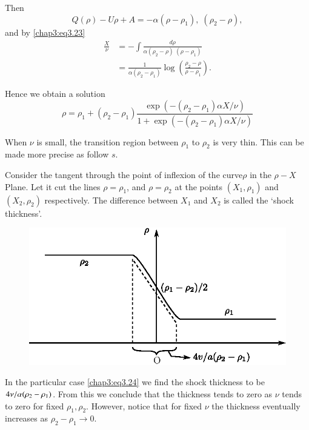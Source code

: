 Then
$$
Q(\rho)-U\rho +A= -\alpha\left(\rho -\rho_1\right),\; \left(\rho_2-\rho\right),
$$
and by \eqref{chap3:eq3.23}
\begin{align*}
\frac{X}{\nu} &= -\int \frac{d\rho}{\alpha(\rho_2-\rho)\;(\rho-\rho_1)}\\
&= \frac{1}{\alpha\left(\rho_2-\rho_1\right)}\log \left(\frac{\rho_2-\rho}{\rho-\rho_1}\right).
\end{align*}

Hence we obtain a solution 
\begin{equation*}
\rho=\rho_1+\left(\rho_2-\rho_1\right)\frac{\exp\left(-\left(\rho_2-\rho_1\right) \alpha X/\nu\right)}{1+\exp\left(-\left(\rho_2-\rho_1\right)\alpha X/\nu\right)} \tag{3.24}\label{chap3:eq3.24}
\end{equation*}

When $\nu$ is small, the transition region between $\rho_1$ to $\rho_2$ is very thin. This can be made more precise as follow $s$.

Consider the tangent through the point of inflexion of the curve\pageoriginale $\rho$ in the $\rho-X$ Plane. Let it cut the lines $\rho=\rho_1$, and $\rho=\rho_2$ at the points $(X_1,\rho_1)$ and $(X_2,\rho_2)$ respectively. The difference between $X_1$ and $X_2$ is called the `shock thickness'. 
\begin{figure}[H]
\centering
\includegraphics{figures/fig61-3.5.eps}
\caption{}
\label{chap1:fig3.5}
\end{figure}

In the particular case \eqref{chap3:eq3.24} we find the shock
thickness to be $4\nu/\alpha\break(\rho_2-\rho_1)$. From this we conclude
that the thickness tends to zero as $\nu$ tends to zero for fixed
$\rho_1,\rho_2$. However, notice that for fixed $\nu$ the thickness
eventually increases as $\rho_2-\rho_1\to 0$. 

